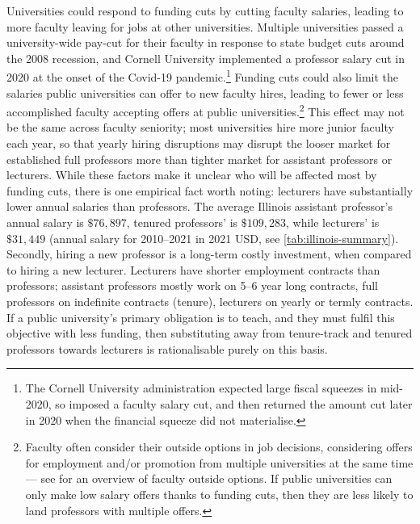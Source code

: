 Universities could respond to funding cuts by cutting faculty salaries, leading to more faculty leaving for jobs at other universities.
Multiple universities passed a university-wide pay-cut for their faculty in response to state budget cuts around the 2008 recession, and Cornell University implemented a professor salary cut in 2020 at the onset of the Covid-19 pandemic.\footnote{
    The Cornell University administration expected large fiscal squeezes in mid-2020, so imposed a faculty salary cut, and then returned the amount cut later in 2020 when the financial squeeze did not materialise.}
Funding cuts could also limit the salaries public universities can offer to new faculty hires, leading to fewer or less accomplished faculty accepting offers at public universities.\footnote{
    Faculty often consider their outside options in job decisions, considering offers for employment and/or promotion from multiple universities at the same time --- see \cite{blackaby2005} for an overview of faculty outside options.
    If public universities can only make low salary offers thanks to funding cuts, then they are less likely to land professors with multiple offers.
}
This effect may not be the same across faculty seniority; most universities hire more junior faculty each year, so that yearly hiring disruptions may disrupt the looser market for established full professors more than tighter market for assistant professors or lecturers.
While these factors make it unclear who will be affected most by funding cuts, there is one empirical fact worth noting: lecturers have substantially lower annual salaries than professors.
The average Illinois assistant professor's annual salary is $\$76,897$, tenured professors' is $\$109,283$, while lecturers' is $\$31,449$ (annual salary for 2010--2021 in 2021 USD, see \autoref{tab:illinois-summary}).
Secondly, hiring a new professor is a long-term costly investment, when compared to hiring a new lecturer.
Lecturers have shorter employment contracts than professors; assistant professors mostly work on 5--6 year long contracts, full professors on indefinite contracts (tenure), lecturers on yearly or termly contracts.
If a public university's primary obligation is to teach, and they must fulfil this objective with less funding, then substituting away from tenure-track and tenured professors towards lecturers is rationalisable purely on this basis.

